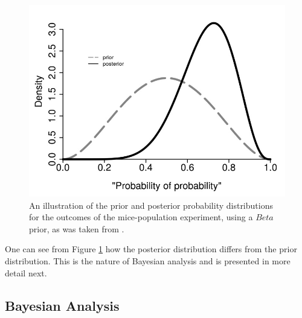 \begin{figure}[htbp]
    \includegraphics[width=\textwidth]{images/mouse_experiment_distributions.jpg}
    \caption{An illustration of the prior and posterior probability distributions for the outcomes of the mice-population experiment, using a $Beta$ prior, as was taken from \cite{ref:hackenberger:2019}.}
    \label{fig:probability:bayesian_statistics:mouse_distributions}
\end{figure}

One can see from Figure \ref{fig:probability:bayesian_statistics:mouse_distributions} how the posterior distribution differs from the prior distribution. This is the nature of Bayesian analysis and is presented in more detail next.

\subsection{Bayesian Analysis}
\label{sec:probability:bayesian_statistics:bayesian_analysis}

